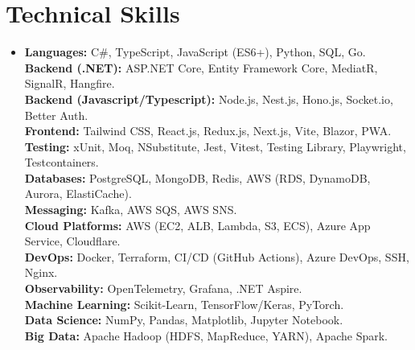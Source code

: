 \documentclass[12pt,a4paper]{article}
\begin{document}
\section{Technical Skills}
 \begin{itemize}[leftmargin=0in, label={}]
    \item {\textbf{Languages:} C\#, TypeScript, JavaScript (ES6+), Python, SQL, Go.\\
    \textbf{Backend (.NET):} ASP.NET Core, Entity Framework Core, MediatR, SignalR, Hangfire.\\
    \textbf{Backend (Javascript/Typescript):} Node.js, Nest.js, Hono.js, Socket.io, Better Auth.\\
    \textbf{Frontend:} Tailwind CSS, React.js, Redux.js, Next.js, Vite, Blazor, PWA.\\
    \textbf{Testing:} xUnit, Moq, NSubstitute, Jest, Vitest, Testing Library, Playwright, Testcontainers.\\
    \textbf{Databases:} PostgreSQL, MongoDB, Redis, AWS (RDS, DynamoDB, Aurora, ElastiCache).\\
    \textbf{Messaging:} Kafka, AWS SQS, AWS SNS.\\
    \textbf{Cloud Platforms:} AWS (EC2, ALB, Lambda, S3, ECS), Azure App Service, Cloudflare.\\
    \textbf{DevOps:} Docker, Terraform, CI/CD (GitHub Actions), Azure DevOps, SSH, Nginx.\\
    \textbf{Observability:} OpenTelemetry, Grafana, .NET Aspire.\\
    \textbf{Machine Learning:} Scikit-Learn, TensorFlow/Keras, PyTorch.\\
    \textbf{Data Science:} NumPy, Pandas, Matplotlib, Jupyter Notebook.\\
    \textbf{Big Data:} Apache Hadoop (HDFS, MapReduce, YARN), Apache Spark.\\
}
\end{itemize}
 
\end{document}
